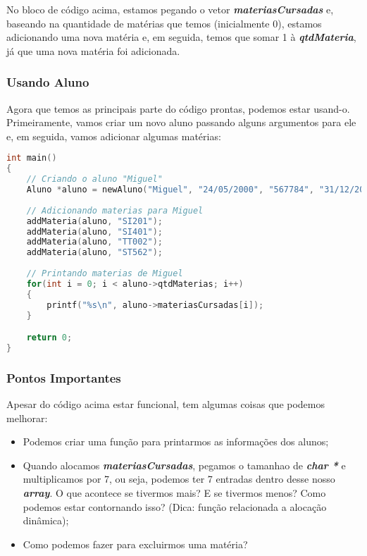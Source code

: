 No bloco de código acima, estamos pegando o vetor \textbf{\textit{materiasCursadas}} e, baseando na quantidade de matérias que temos (inicialmente 0), estamos adicionando uma nova matéria e, em seguida, temos que somar 1 à \textbf{\textit{qtdMateria}}, já que uma nova matéria foi adicionada.

\subsubsection{Usando Aluno}
Agora que temos as principais parte do código prontas, podemos estar usand-o. Primeiramente, vamos criar um novo aluno passando alguns argumentos para ele e, em seguida, vamos adicionar algumas matérias:
\begin{lstlisting}[language=C]
int main()
{
    // Criando o aluno "Miguel"
    Aluno *aluno = newAluno("Miguel", "24/05/2000", "567784", "31/12/2027");
    
    // Adicionando materias para Miguel
    addMateria(aluno, "SI201");
    addMateria(aluno, "SI401");
    addMateria(aluno, "TT002");
    addMateria(aluno, "ST562");
    
    // Printando materias de Miguel
    for(int i = 0; i < aluno->qtdMaterias; i++)
    {
        printf("%s\n", aluno->materiasCursadas[i]);
    }

    return 0;
}
\end{lstlisting}

\subsubsection{Pontos Importantes}
Apesar do código acima estar funcional, tem algumas coisas que podemos melhorar:
\begin{itemize}
    \item Podemos criar uma função para printarmos as informações dos alunos;
    \item Quando alocamos \textbf{\textit{materiasCursadas}}, pegamos o tamanhao de \textbf{\textit{char *}} e multiplicamos por 7, ou seja, podemos ter 7 entradas dentro desse nosso \textbf{\textit{array}}. O que acontece se tivermos mais? E se tivermos menos? Como podemos estar contornando isso? (Dica: função relacionada a alocação dinâmica);
    \item Como podemos fazer para excluirmos uma matéria?
\end{itemize}
